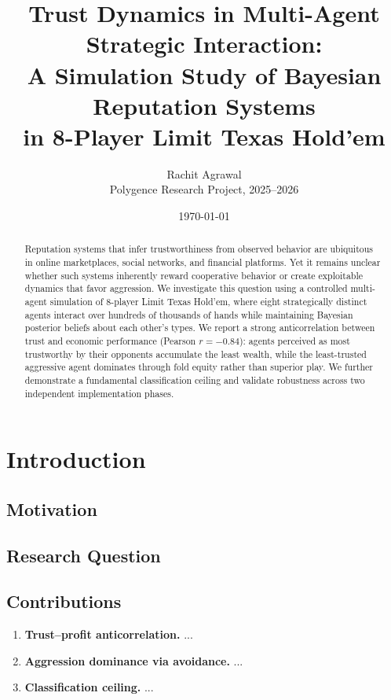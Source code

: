 \documentclass[11pt]{article}
\title{Trust Dynamics in Multi-Agent Strategic Interaction:\\
  A Simulation Study of Bayesian Reputation Systems\\
  in 8-Player Limit Texas Hold'em}
\author{Rachit Agrawal\\
  Polygence Research Project, 2025--2026}
\date{\today}
\begin{document}
\maketitle

\begin{abstract}
Reputation systems that infer trustworthiness from observed behavior are
ubiquitous in online marketplaces, social networks, and financial
platforms. Yet it remains unclear whether such systems inherently reward
cooperative behavior or create exploitable dynamics that favor aggression.
We investigate this question using a controlled multi-agent simulation of
8-player Limit Texas Hold'em, where eight strategically distinct agents
interact over hundreds of thousands of hands while maintaining Bayesian
posterior beliefs about each other's types. We report a strong
anticorrelation between trust and economic performance (Pearson
$r = -0.84$): agents perceived as most trustworthy by their opponents
accumulate the least wealth, while the least-trusted aggressive agent
dominates through fold equity rather than superior play. We further
demonstrate a fundamental classification ceiling and validate
robustness across two independent implementation phases.
\end{abstract}

\section{Introduction}
\label{sec:intro}

\subsection{Motivation}

\subsection{Research Question}

\subsection{Contributions}
\begin{enumerate}
  \item \textbf{Trust--profit anticorrelation.} ...
  \item \textbf{Aggression dominance via avoidance.} ...
  \item \textbf{Classification ceiling.} ...
\end{enumerate}
\end{document}
